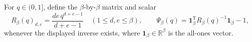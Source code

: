For \(q\in(0,1]\), define the \(\beta\)-by-\(\beta\) matrix and scalar
\[
R_\beta(q)_{d,e}=\frac{de\,q^{d+e-1}}{d+e-1}
\quad(1\le d,e\le\beta),
\qquad
\Psi_\beta(q)=\mathbf 1_\beta^{\mathsf T}R_\beta(q)^{-1}\mathbf 1_\beta-1,
\]
whenever the displayed inverse exists, where \(\mathbf 1_\beta\in\mathbb R^\beta\) is the all-ones vector.